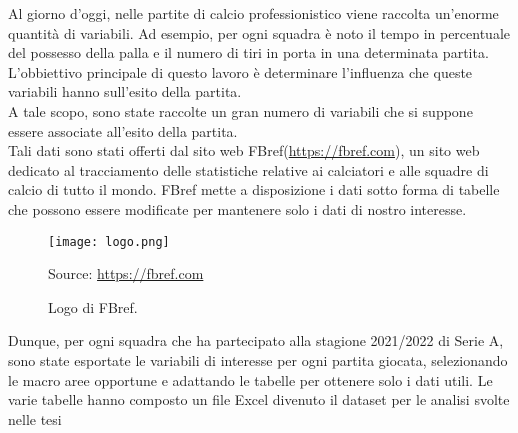 Al giorno d'oggi, nelle partite di calcio professionistico viene raccolta un'enorme quantità di variabili. Ad esempio, per ogni squadra è noto il tempo in percentuale del possesso della palla e il numero di tiri in porta in una determinata partita. L'obbiettivo principale di questo lavoro è determinare l'influenza che queste variabili hanno sull'esito della partita. \\
A tale scopo, sono state raccolte un gran numero di variabili che si suppone essere associate all'esito della partita.\\
Tali dati sono stati offerti dal sito web FBref(\url{https://fbref.com}), un sito web dedicato al tracciamento delle statistiche relative ai calciatori e alle squadre di calcio di tutto il mondo. FBref mette a disposizione i dati sotto forma di tabelle che possono essere modificate per mantenere solo i dati di nostro interesse.\\
\begin{figure}[!htb]
	\begin{center}
		\texttt{[image: logo.png]}
		\caption{Logo di FBref.} 
		Source: \url{https://fbref.com}
		\label{fig:logo}
	\end{center}
\end{figure}



Dunque, per ogni squadra che ha partecipato alla stagione 2021/2022 di Serie A, sono state esportate le variabili di interesse per ogni partita giocata, selezionando le macro aree opportune e adattando le tabelle per ottenere solo i dati utili. Le varie tabelle hanno composto un file Excel divenuto il dataset per le analisi svolte nelle tesi 

